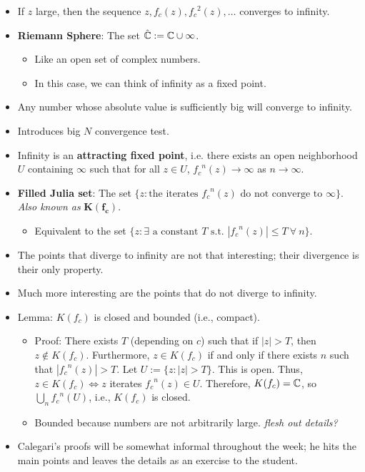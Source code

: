 \documentclass[../main.tex]{subfiles}
\begin{document}
\begin{itemize}
    \item If $z$ large, then the sequence $z,f_c(z),{f_c}^2(z),\dots$ converges to infinity.
    \item \textbf{Riemann Sphere}: The set $\hat{\mathbb{C}}:=\mathbb{C}\cup\infty$.
    \begin{itemize}
        \item Like an open set of complex numbers.
        \item In this case, we can think of infinity as a fixed point.
    \end{itemize}
    \item Any number whose absolute value is sufficiently big will converge to infinity.
    \item Introduces big $N$ convergence test.
    \item Infinity is an \textbf{attracting fixed point}, i.e. there exists an open neighborhood $U$ containing $\infty$ such that for all $z\in U$, ${f_c}^n(z)\to\infty$ as $n\to\infty$.
    \item \textbf{Filled Julia set}: The set $\{z:\text{the iterates }{f_c}^n(z)\text{ do not converge to }\infty\}$. \emph{Also known as} $\bm{K(f_c)}$.
    \begin{itemize}
        \item Equivalent to the set $\{z:\exists\text{ a constant }T\text{ s.t. }|{f_c}^n(z)|\leq T\ \forall\ n\}$.
    \end{itemize}
    \item The points that diverge to infinity are not that interesting; their divergence is their only property.
    \item Much more interesting are the points that do not diverge to infinity.
    \item Lemma: $K(f_c)$ is closed and bounded (i.e., compact).
    \begin{itemize}
        \item Proof: There exists $T$ (depending on $c$) such that if $|z|>T$, then $z\notin K(f_c)$. Furthermore, $z\in K(f_c)$ if and only if there exists $n$ such that $|{f_c}^n(z)|>T$. Let $U:=\{z:|z|>T\}$. This is open. Thus, $z\in K(f_c)\Longleftrightarrow z$ iterates ${f_c}^n(z)\in U$. Therefore, $K(f_c)=\mathbb{C}$, so $\bigcup_n{f_c}^n(U)$, i.e., $K(f_c)$ is closed.
        \item Bounded because numbers are not arbitrarily large. \emph{flesh out details?}
    \end{itemize}
    \item Calegari's proofs will be somewhat informal throughout the week; he hits the main points and leaves the details as an exercise to the student.

\end{itemize}
\end{document}
